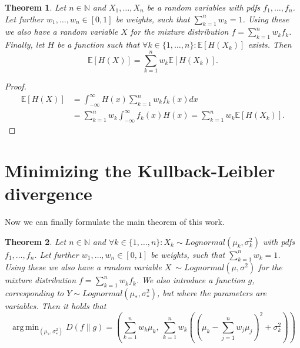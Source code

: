 \documentclass{article}
\newtheorem{theorem}{Theorem}[section]
\DeclareMathOperator*{\argmin}{arg\,min}
\begin{document}
\begin{theorem} 
\label{moments-of-mixture}
Let $n \in \mathbb{N}$ and $X_{1},\dots,X_{n}$ be a random variables with pdfs $f_{1},\dots,f_{n}$. Let further $w_{1},\dots,w_{n} \in [0,1]$ be weights, such that $\sum_{k=1}^{n}{w_{k}} = 1$. Using these we also have a random variable $X$ for the mixture distribution $f = \sum_{k=1}^{n}{w_{k}f_{k}}$. Finally, let $H$ be a function such that $\forall k \in \{1,\dots,n\}:\mathbb{E}[H(X_{k})]$ exists. Then
\begin{equation}
    \mathbb{E}[H(X)] = \sum_{k=1}^{n}{w_{k}\mathbb{E}[H(X_{k})]} \text{.}
\end{equation}
    
\end{theorem}

\begin{proof}
\begin{align*}
    \mathbb{E}[H(X)] &= \int_{-\infty}^{\infty} {H(x) \sum_{k=1}^{n}{w_{k}f_{k}(x)} dx} \\
    &= \sum_{k=1}^{n}{w_{k}}\int_{-\infty}^{\infty} {f_{k}(x) H(x)} = \sum_{k=1}^{n}{w_{k}\mathbb{E}[H(X_{k})]} \text{.}
\end{align*}
\end{proof}

\section{Minimizing the Kullback-Leibler divergence}

Now we can finally formulate the main theorem of this work. 
\begin{theorem}
Let $n \in \mathbb{N}$ and $\forall k \in \{1,\dots,n\}: X_{k} \sim Lognormal(\mu_{k}, \sigma_{k}^{2})$ with pdfs $f_{1},\dots,f_{n}$. Let further $w_{1},\dots,w_{n} \in [0,1]$ be weights, such that $\sum_{k=1}^{n}{w_{k}} = 1$. Using these we also have a random variable $X \ \sim Lognormal(\mu, \sigma^{2})$ for the mixture distribution $f = \sum_{k=1}^{n}{w_{k}f_{k}}$. We also introduce a function $g$, corresponding to $Y \sim Lognormal(\mu_{*}, \sigma_{*}^{2})$, but where the parameters are variables. Then it holds that 
\begin{equation}
    \argmin_{(\mu_{*},\sigma_{*}^{2})} D(f \parallel g) = \left( \sum_{k=1}^{n}{w_{k} \mu_{k}},\   \sum_{k=1}^{n}{w_{k}\left(\left(\mu_{k}-\sum_{j=1}^{n} w_{j}\mu_{j}\right)^{2} + \sigma_{k}^{2}\right)} \right)
\end{equation}
\end{theorem}
\end{document}
